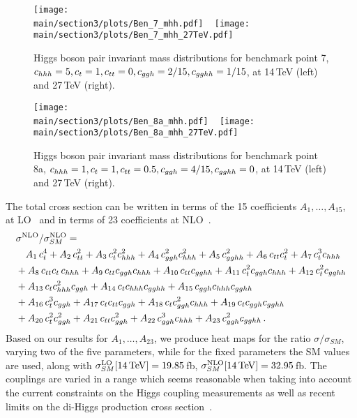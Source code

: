 \begin{figure}[htb]
\texttt{[image: \\main/section3/plots/Ben\_7\_mhh.pdf]}
~
 \texttt{[image: \\main/section3/plots/Ben\_7\_mhh\_27TeV.pdf]}
\caption{Higgs boson pair invariant mass distributions  for benchmark point 7, $c_{hhh}=5,c_{t}= 1, c_{tt}=0, c_{ggh}=2/15,c_{gghh}=1/15$, at 14\,TeV (left) and 27\,TeV (right).}
\label{fig:benchmark7}
\end{figure}
%
\begin{figure}[htb]
  \centering
  \texttt{[image: \\main/section3/plots/Ben\_8a\_mhh.pdf]} 
~
\texttt{[image: \\main/section3/plots/Ben\_8a\_mhh\_27TeV.pdf]}
\caption{Higgs boson pair invariant mass distributions  for benchmark point 8a, $c_{hhh}=1,c_{t}= 1, c_{tt}=0.5, c_{ggh}=4/15,c_{gghh}=0$, at 14\,TeV (left) and 27\,TeV (right).}
\label{fig:benchmark8a}
\end{figure}
%




The total cross section can be written in terms of the 15 coefficients 
$A_1, \ldots, A_{15}$, at LO~\cite{Carvalho:2015ttv,Azatov:2015oxa} and in terms of 23 coefficients at NLO~\cite{Buchalla:2018yce}.
%
\begin{align}
\label{eq:Acoeffs_all}
&\sigma^{\rm{NLO}}/\sigma^{\rm{NLO}}_{SM}  =\nonumber\\
& \quad  A_1\, c_t^4 + A_2 \, c_{tt}^2  + A_3\,  c_t^2 c_{hhh}^2  + 
A_4 \, c_{ggh}^2 c_{hhh}^2  + A_5\,  c_{gghh}^2  + 
A_6\, c_{tt} c_t^2 + A_7\,  c_t^3 c_{hhh} \nonumber\\
& + A_8\,  c_{tt} c_t\, c_{hhh}  + A_9\, c_{tt} c_{ggh} c_{hhh} + A_{10}\, c_{tt} c_{gghh} + 
A_{11}\,  c_t^2 c_{ggh} c_{hhh} + A_{12}\, c_t^2 c_{gghh} \nonumber\\
& + A_{13}\, c_t c_{hhh}^2 c_{ggh}  + A_{14}\, c_t c_{hhh} c_{gghh} +
A_{15}\, c_{ggh} c_{hhh} c_{gghh} \nonumber\\ 
& + A_{16}\, c^3_t c_{ggh} + A_{17}\,  c_t c_{tt} c_{ggh} 
+ A_{18}\, c_t c_{ggh}^2 c_{hhh} + A_{19}\, c_t c_{ggh} c_{gghh} 
\nonumber\\
&+ A_{20}\,  c_t^2 c_{ggh}^2 + A_{21}\, c_{tt} c_{ggh}^2 
+ A_{22}\, c_{ggh}^3 c_{hhh} + A_{23}\, c_{ggh}^2 c_{gghh}\,.
\end{align}
Based on our results for $A_1,\ldots, A_{23}$, we produce heat maps for the ratio $\sigma/\sigma_{SM}$, 
varying two of the five parameters, while for the fixed parameters the SM values are used, along with
$\sigma_{SM}^{\rm{LO}}[14\,\mathrm{TeV}]=19.85$\,fb,
$\sigma_{SM}^{\rm{NLO}}[14\,\mathrm{TeV}]=32.95$\,fb.
The couplings are varied in a range which seems reasonable when taking into account the current constraints on the 
Higgs coupling measurements
as well as recent limits on the di-Higgs production cross
section~\cite{CMS-PAS-HIG-17-030,ATLAS-CONF-2018-043}.

